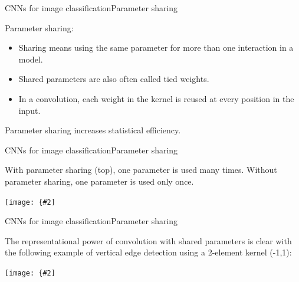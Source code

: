 \documentclass{beamer}
\newcommand{\myfig}[3]{\centerline{\texttt{[image: \{\#2]}}}
\begin{document}
\begin{frame}{CNNs for image classification}{Parameter sharing}

  \alert{Parameter sharing}:
  \begin{itemize}
    \item Sharing means using the same parameter for more than one interaction
      in a model.
    \item Shared parameters are also often called \alert{tied weights}.
      \item In a convolution, each weight in the kernel
        is \alert{reused} at every position in the input.
  \end{itemize}

  Parameter sharing \alert{increases statistical efficiency}.
  
\end{frame}


\begin{frame}{CNNs for image classification}{Parameter sharing}

With parameter sharing (top), one parameter is used many times.
Without parameter sharing, one parameter is used only once.
\myfig{3in}{goodfellow-fig9-5}{Goodfellow et al. (2016), Figure 9.5}

\end{frame}


\begin{frame}{CNNs for image classification}{Parameter sharing}

The representational power of convolution with shared parameters is
clear with the following example of vertical edge detection using a
2-element kernel (-1,1):

\myfig{3in}{goodfellow-fig9-6}{Goodfellow et al. (2016), Figure 9.6}

\end{frame}
\end{document}
